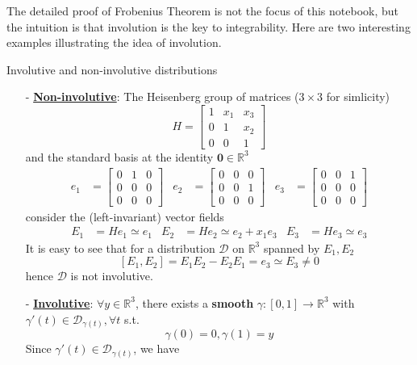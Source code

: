 The detailed proof of Frobenius Theorem is not the focus of this notebook, but the intuition is that involution is the key to integrability. Here are two interesting examples illustrating the idea of involution.
\begin{example}{Involutive and non-involutive distributions}
    \begin{enumerate}
        \item[-] \underline{\textbf{Non-involutive}}: The Heisenberg group of matrices ($3\times 3$ for simlicity) $$ H =\begin{bmatrix}
            1 & x_1 & x_3 \\
            0 & 1 & x_2 \\
            0 & 0 & 1
        \end{bmatrix} $$
        and the standard basis at the identity $\mathbf{0}\in\mathbb{R}^3$
        \begin{align*}
            e_1 &= \begin{bmatrix}
                0 & 1 & 0 \\
                0 & 0 & 0 \\
                0 & 0 & 0
            \end{bmatrix} & e_2 &=\begin{bmatrix}
                0 & 0 & 0 \\
                0 & 0 & 1 \\
                0 & 0 & 0
            \end{bmatrix} & e_3 &=\begin{bmatrix}
                0 & 0 & 1 \\
                0 & 0 & 0 \\
                0 & 0 & 0
            \end{bmatrix}
        \end{align*}
        consider the (left-invariant) vector fields 
        \begin{align*}
            E_1 &= H e_1 \simeq e_1 & E_2 &= He_2 \simeq e_2+x_1e_3 & E_3 &= H e_3 \simeq e_3
        \end{align*}
        It is easy to see that for a distribution $\mathcal{D}$ on $\mathbb{R}^3$ spanned by $E_1,E_2$ 
        $$
            [E_1,E_2] = E_1E_2-E_2E_1 = e_3 \simeq E_3 \neq 0
        $$
        hence $\mathcal{D}$ is not involutive.
        \item[-] \underline{\textbf{Involutive}}: $\forall y\in \mathbb{R}^3$, there exists a \textbf{smooth} $\gamma:[0,1]\rightarrow \mathbb{R}^3$ with $\gamma'(t)\in \mathcal{D}_{\gamma(t)}, \forall t$ s.t. $$\gamma(0)=0,\gamma(1)=y$$ Since $\gamma'(t) \in \mathcal{D}_{\gamma(t)}$, we have 

\end{enumerate}
\end{example}
